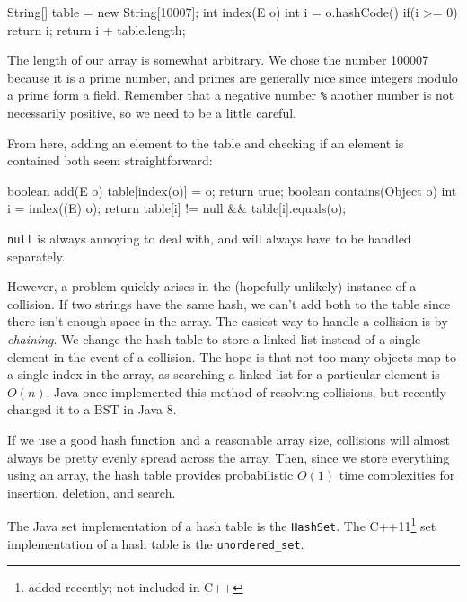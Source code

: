 \begin{mylstlisting}
String[] table = new String[10007];
int index(E o) {
	int i = o.hashCode() %
    if(i >= 0)
    	return i;
	return i + table.length;
}
\end{mylstlisting}

The length of our array is somewhat arbitrary. We chose the number 100007 because it is a prime number, and primes are generally nice since integers modulo a prime form a field. Remember that a negative number \texttt{\%} another number is not necessarily positive, so we need to be a little careful.

From here, adding an element to the table and checking if an element is contained both seem straightforward:

\begin{mylstlisting}
boolean add(E o) {
	table[index(o)] = o;
    return true;
}
boolean contains(Object o) {
    int i = index((E) o);
	return table[i] != null && table[i].equals(o);
}
\end{mylstlisting}

\texttt{null} is always annoying to deal with, and will always have to be handled separately.

However, a problem quickly arises in the (hopefully unlikely) instance of a collision. If two strings have the same hash, we can't add both to the table since there isn't enough space in the array. The easiest way to handle a collision is by \textit{chaining}. We change the hash table to store a linked list instead of a single element in the event of a collision. The hope is that not too many objects map to a single index in the array, as searching a linked list for a particular element is $O(n)$. Java once implemented this method of resolving collisions, but recently changed it to a BST in Java 8.

If we use a good hash function and a reasonable array size, collisions will almost always be pretty evenly spread across the array. Then, since we store everything using an array, the hash table provides probabilistic $O(1)$ time complexities for insertion, deletion, and search.

The Java set implementation of a hash table is the \texttt{HashSet}. The C++11\footnote{added recently; not included in C++} set implementation of a hash table is the \texttt{unordered\_set}.

